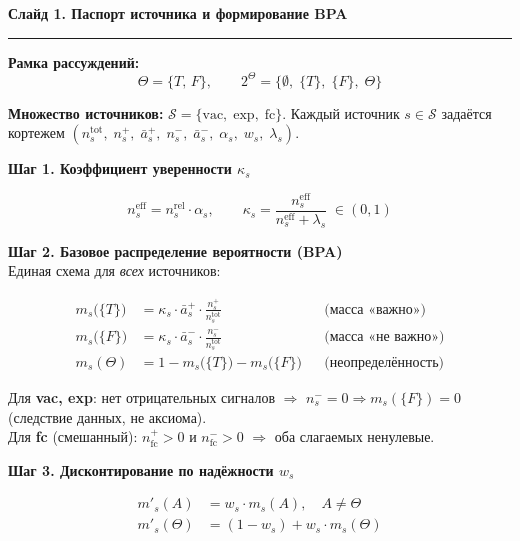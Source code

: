 \documentclass[12pt,a4paper]{article}
\begin{document}
\begin{center}
{\large\bfseries Слайд 1. Паспорт источника и формирование BPA}
\end{center}
\medskip
\hrule
\bigskip

\noindent
\textbf{Рамка рассуждений:}
\[
  \Theta = \{T,\,F\}, \qquad
  2^\Theta = \bigl\{\emptyset,\;\{T\},\;\{F\},\;\Theta\bigr\}
\]

\noindent
\textbf{Множество источников:}
$\mathcal{S} = \{\mathrm{vac},\;\mathrm{exp},\;\mathrm{fc}\}$.
Каждый источник $s \in \mathcal{S}$ задаётся кортежем
$(n_s^{\mathrm{tot}},\; n_s^{+},\; \bar{a}_s^{+},\; n_s^{-},\;
 \bar{a}_s^{-},\; \alpha_s,\; w_s,\; \lambda_s)$.

\bigskip
\noindent\textbf{Шаг 1. Коэффициент уверенности $\kappa_s$}

\[
  n_s^{\mathrm{eff}} = n_s^{\mathrm{rel}} \cdot \alpha_s,
  \qquad
  \kappa_s = \frac{n_s^{\mathrm{eff}}}{n_s^{\mathrm{eff}} + \lambda_s}
  \;\in (0,1)
\]

\bigskip
\noindent\textbf{Шаг 2. Базовое распределение вероятности (BPA)}\\
Единая схема для \emph{всех} источников:

\begin{align*}
  m_s\!\bigl(\{T\}\bigr)
    &= \kappa_s \cdot \bar{a}_s^{+} \cdot
       \frac{n_s^{+}}{n_s^{\mathrm{tot}}}
    &&\text{(масса «важно»)}\\[6pt]
  m_s\!\bigl(\{F\}\bigr)
    &= \kappa_s \cdot \bar{a}_s^{-} \cdot
       \frac{n_s^{-}}{n_s^{\mathrm{tot}}}
    &&\text{(масса «не важно»)}\\[6pt]
  m_s(\Theta)
    &= 1 - m_s\!\bigl(\{T\}\bigr) - m_s\!\bigl(\{F\}\bigr)
    &&\text{(неопределённость)}
\end{align*}

\noindent
Для \textbf{vac, exp}: нет отрицательных сигналов $\Rightarrow$
$n_s^{-} = 0 \Rightarrow m_s(\{F\}) = 0$ (следствие данных, не аксиома).\\
Для \textbf{fc} (смешанный): $n_{\mathrm{fc}}^{+} > 0$ и
$n_{\mathrm{fc}}^{-} > 0$ $\Rightarrow$ оба слагаемых ненулевые.

\bigskip
\noindent\textbf{Шаг 3. Дисконтирование по надёжности $w_s$}

\begin{align*}
  m'_s(A)      &= w_s \cdot m_s(A),
    \quad A \neq \Theta \\[6pt]
  m'_s(\Theta) &= (1 - w_s) + w_s \cdot m_s(\Theta)
\end{align*}
\end{document}
